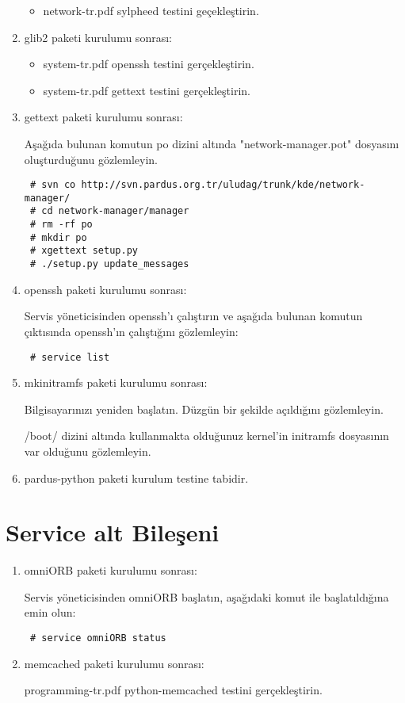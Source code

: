 \documentclass[a4paper,10pt]{article}
\begin{document}
\begin{enumerate}
\begin{itemize}
\item network-tr.pdf sylpheed testini geçekleştirin.
\end{itemize}

\item glib2 paketi kurulumu sonrası:
\begin{itemize}
 \item system-tr.pdf openssh testini gerçekleştirin.
\item system-tr.pdf gettext testini gerçekleştirin.
\end{itemize}

\item gettext paketi kurulumu sonrası:

Aşağıda bulunan komutun po dizini altında "network-manager.pot" dosyasını oluşturduğunu gözlemleyin.
\begin{verbatim}
 # svn co http://svn.pardus.org.tr/uludag/trunk/kde/network-manager/
 # cd network-manager/manager
 # rm -rf po
 # mkdir po
 # xgettext setup.py 
 # ./setup.py update_messages
\end{verbatim}


\item openssh paketi kurulumu sonrası:

Servis yöneticisinden openssh'ı çalıştırın ve aşağıda bulunan komutun çıktısında openssh'ın çalıştığını gözlemleyin:
\begin{verbatim}
 # service list 
\end{verbatim}

\item mkinitramfs paketi kurulumu sonrası:

Bilgisayarınızı yeniden başlatın. Düzgün bir şekilde açıldığını gözlemleyin.

/boot/ dizini altında kullanmakta olduğunuz kernel'in initramfs dosyasının var olduğunu gözlemleyin.

\item pardus-python paketi kurulum testine tabidir.

\end{enumerate}
\section{Service alt Bileşeni}
\begin{enumerate}
\item omniORB paketi kurulumu sonrası:

Servis yöneticisinden omniORB başlatın, aşağıdaki komut ile başlatıldığına emin olun:
\begin{verbatim}
 # service omniORB status
\end{verbatim}

 \item memcached paketi kurulumu sonrası:

  programming-tr.pdf python-memcached testini gerçekleştirin. 
\end{enumerate}
\end{document}

